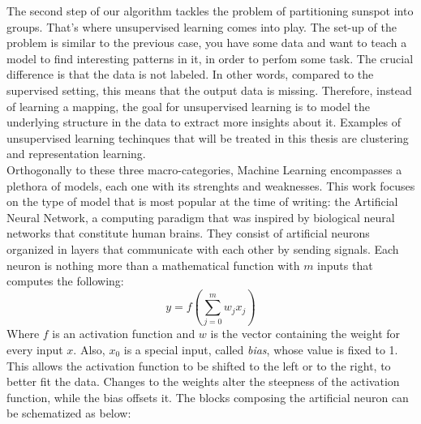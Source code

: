 The second step of our algorithm tackles the problem of partitioning sunspot into groups. That's where unsupervised learning comes into play. The set-up of the problem is similar to the previous case, you have some data and want to teach a model to find interesting patterns in it, in order to perfom some task. The crucial difference is that the data is not labeled. In other words, compared to the supervised setting, this means that the output data is missing. Therefore, instead of learning a mapping, the goal for unsupervised learning is to model the underlying structure in the data to extract more insights about it. Examples of unsupervised learning techinques that will be treated in this thesis are clustering and representation learning.\\
Orthogonally to these three macro-categories, Machine Learning encompasses a plethora of models, each one with its strenghts and weaknesses. This work focuses on the type of model that is most popular at the time of writing: the Artificial Neural Network, a computing paradigm that was inspired by biological neural networks that constitute human brains. They consist of artificial neurons organized in layers that communicate with each other by sending signals. Each neuron is nothing more than a mathematical function with $m$ inputs that computes the following:
\begin{equation}
y = f \left(\sum_{j=0}^{m} w_{j}x_{j}\right)
\end{equation}
Where $f$ is an activation function and $w$ is the vector containing the weight for every input $x$. Also, $x_0$ is a special input, called \textit{bias}, whose value is fixed to 1. This allows the activation function to be shifted to the left or to the right, to better fit the data. Changes to the weights alter the steepness of the activation function, while the bias offsets it. The blocks composing the artificial neuron can be schematized as below: \\

